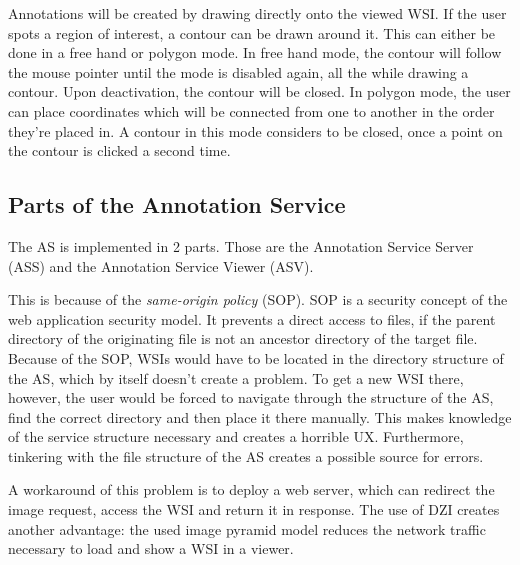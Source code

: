 Annotations will be created by drawing directly onto the viewed WSI. If the user spots a region of interest, a contour can be drawn around it. This can  either be done in a free hand or polygon mode. In free hand mode, the contour will follow the mouse pointer until the mode is disabled again, all the while drawing a contour. Upon deactivation, the contour will be closed. In polygon mode, the user can place coordinates which will be connected from one to another in the order they're placed in. A contour in this mode considers to be closed, once a point on the contour is clicked a second time.




\subsection{Parts of the Annotation Service}
The AS is implemented in 2 parts. Those are the Annotation Service Server (ASS) and the Annotation Service Viewer (ASV).

This is because of the \emph{same-origin policy} (SOP). SOP is a security concept of the web application security model. It prevents a direct access to files, if the parent directory of the originating file is not an ancestor directory of the target file\cite{web:mdn}. Because of the SOP, WSIs would have to be located in the directory structure of the AS, which by itself doesn't create a problem. To get a new WSI there, however, the user would be forced to navigate through the structure of the AS, find the correct directory and then place it there manually. This makes knowledge of the service structure necessary and creates a horrible UX. Furthermore, tinkering with the file structure of the AS creates a possible source for errors.

A workaround of this problem is to deploy a web server, which can redirect the image request, access the WSI and return it in response\cite{Tseytlin14}. The use of DZI creates another advantage: the used image pyramid model reduces the network traffic necessary to load and show a WSI in a viewer\cite{Cornish13}\cite{DICOM10}.

